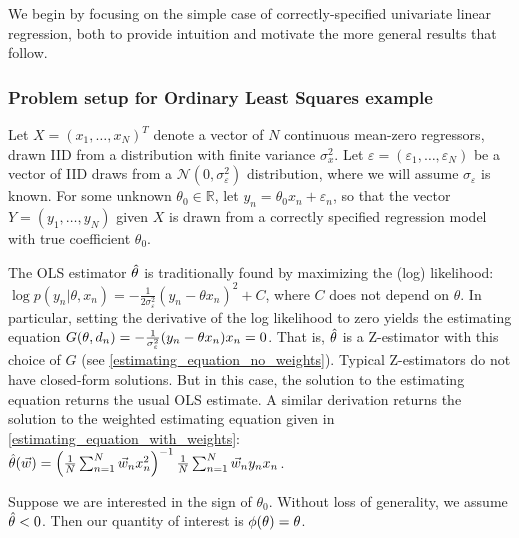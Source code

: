 We begin by focusing on the simple case of correctly-specified univariate linear
regression, both to provide intuition and motivate the more general results
that follow.

\subsubsection{Problem setup for Ordinary Least Squares example}

%
\sloppy Let $X=(x_1, \ldots, x_N)^T$ denote a vector of $N$ continuous mean-zero
regressors, drawn IID from a distribution with finite variance $\sigma_x^2$. Let
$\varepsilon=(\varepsilon_1, \ldots, \varepsilon_N)$ be a vector of IID
draws from a $\mathcal{N}(0, \sigma_\varepsilon^2)$ distribution, where
we will assume $\sigma_\varepsilon$ is known.  For some unknown $\theta_0 \in
\mathbb{R}$, let $y_n = \theta_0 x_n + \varepsilon_n$, so that the vector
$Y=(y_1, \ldots, y_N)$ given $X$ is drawn from a correctly specified regression
model with true coefficient $\theta_0$.

%
The OLS estimator $\hat{\theta}$ is traditionally found by maximizing the (log)
likelihood: $\log p(y_n \vert \theta, x_n) = -\frac{1}{2
\sigma_\varepsilon^{2}}(y_n - \theta x_n)^2 + C$, where $C$ does not depend on
$\theta$. In particular, setting the derivative of the log likelihood to zero
yields the estimating equation $G(\theta, d_n) =
-\frac{1}{\sigma_\varepsilon^{2}} (y_n - \theta x_n) x_n = 0$. That is,
$\hat{\theta}$ is a Z-estimator with this choice of $G$ (see
\eqref{estimating_equation_no_weights}). Typical Z-estimators do not have
closed-form solutions. But in this case, the solution to the estimating equation
returns the usual OLS estimate. A similar derivation returns the solution to the
weighted estimating equation given in \eqref{estimating_equation_with_weights}:
$\hat{\theta}(\vec{w}) = \left(\frac{1}{N}\sum_{n=1}^N \vec{w}_n x_n^2 \right)^{-1} \frac{1}{N}\sum_{n=1}^N \vec{w}_n y_n x_n$.


%
Suppose we are interested in the sign of
$\theta_0$. Without loss of generality, we assume $\hat{\theta} < 0$. Then our
quantity of interest is $\phi(\theta) = \theta$.


